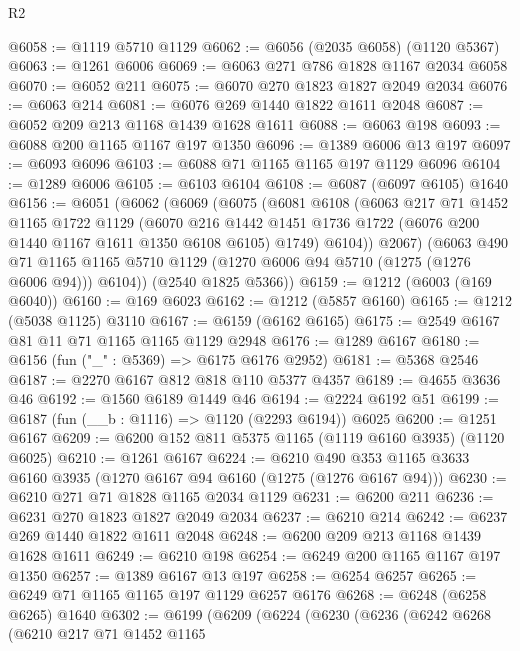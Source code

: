 \begin{lexlean}{R2}
\begin{coremodule}
@6058 := @1119 @5710 @1129
@6062 := @6056 (@2035 @6058) (@1120 @5367)
@6063 := @1261 @6006
@6069 := @6063 @271 @786 @1828 @1167 @2034 @6058
@6070 := @6052 @211
@6075 := @6070 @270 @1823 @1827 @2049 @2034
@6076 := @6063 @214
@6081 := @6076 @269 @1440 @1822 @1611 @2048
@6087 := @6052 @209 @213 @1168 @1439 @1628 @1611
@6088 := @6063 @198
@6093 := @6088 @200 @1165 @1167 @197 @1350
@6096 := @1389 @6006 @13 @197
@6097 := @6093 @6096
@6103 := @6088 @71 @1165 @1165 @197 @1129 @6096
@6104 := @1289 @6006
@6105 := @6103 @6104
@6108 := @6087 (@6097 @6105) @1640
@6156 := @6051
    (@6062
      (@6069
        (@6075
          (@6081
            @6108
            (@6063
              @217
              @71
              @1452
              @1165
              @1722
              @1129
              (@6070
                @216
                @1442
                @1451
                @1736
                @1722
                (@6076 @200 @1440 @1167 @1611 @1350 @6108 @6105)
                @1749)
              @6104))
          @2067)
        (@6063
          @490
          @71
          @1165
          @1165
          @5710
          @1129
          (@1270 @6006 @94 @5710 (@1275 (@1276 @6006 @94)))
          @6104))
      (@2540 @1825 @5366))
@6159 := @1212 (@6003 (@169 @6040))
@6160 := @169 @6023
@6162 := @1212 (@5857 @6160)
@6165 := @1212 (@5038 @1125) @3110
@6167 := @6159 (@6162 @6165)
@6175 := @2549 @6167 @81 @11 @71 @1165 @1165 @1129 @2948
@6176 := @1289 @6167
@6180 := @6156 (fun ("_" : @5369) => @6175 @6176 @2952)
@6181 := @5368 @2546
@6187 := @2270 @6167 @812 @818 @110 @5377 @4357
@6189 := @4655 @3636 @46
@6192 := @1560 @6189 @1449 @46
@6194 := @2224 @6192 @51
@6199 := @6187 (fun (__b : @1116) => @1120 (@2293 @6194)) @6025
@6200 := @1251 @6167
@6209 := @6200 @152 @811 @5375 @1165 (@1119 @6160 @3935) (@1120 @6025)
@6210 := @1261 @6167
@6224 := @6210 @490 @353 @1165 @3633 @6160 @3935 (@1270 @6167 @94 @6160 (@1275 (@1276 @6167 @94)))
@6230 := @6210 @271 @71 @1828 @1165 @2034 @1129
@6231 := @6200 @211
@6236 := @6231 @270 @1823 @1827 @2049 @2034
@6237 := @6210 @214
@6242 := @6237 @269 @1440 @1822 @1611 @2048
@6248 := @6200 @209 @213 @1168 @1439 @1628 @1611
@6249 := @6210 @198
@6254 := @6249 @200 @1165 @1167 @197 @1350
@6257 := @1389 @6167 @13 @197
@6258 := @6254 @6257
@6265 := @6249 @71 @1165 @1165 @197 @1129 @6257 @6176
@6268 := @6248 (@6258 @6265) @1640
@6302 := @6199
    (@6209
      (@6224
        (@6230
          (@6236
            (@6242
              @6268
              (@6210
                @217
                @71
                @1452
                @1165

\end{coremodule}
\end{lexlean}

